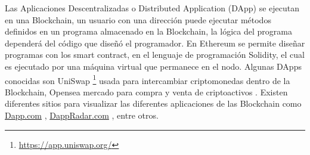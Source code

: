 Las Aplicaciones Descentralizadas o Distributed Application (DApp) se ejecutan en una Blockchain,
un usuario con una dirección puede ejecutar métodos definidos en un programa almacenado
en la Blockchain, la lógica del programa dependerá del código
que diseñó el programador. En Ethereum se permite diseñar programas con
los smart contract, en el lenguaje de programación Solidity, 
el cual es ejecutado por una máquina virtual que permanece en el nodo.
Algunas DApps conocidas son UniSwap \footnote{\url{https://app.uniswap.org/}}   usada para intercambiar criptomonedas 
dentro de la Blockchain, Opensea mercado para compra y venta de criptoactivos
\cite[]{dannen_introducing_2017}.
Existen diferentes sitios para visualizar las diferentes aplicaciones de las  Blockchain como \href{https://www.dapp.com/}{Dapp.com} , \href{https://dappradar.com/}{DappRadar.com}
, entre otros.  